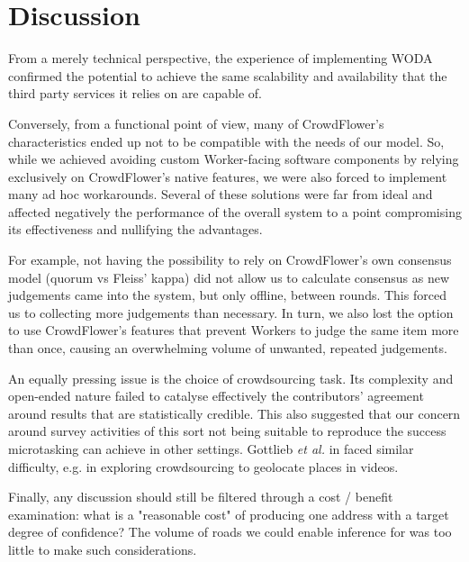 \section{Discussion}

From a merely technical perspective, the experience of implementing WODA confirmed the potential to achieve the same scalability and availability that the third party services it relies on are capable of.

Conversely, from a functional point of view, many of CrowdFlower's characteristics ended up not to be compatible with the needs of our model. So, while we achieved avoiding custom Worker-facing software components by relying exclusively on CrowdFlower's native features, we were also forced to implement many ad hoc workarounds. Several of these solutions were far from ideal and affected negatively the performance of the overall system to a point compromising its effectiveness and nullifying the advantages. 

For example, not having the possibility to rely on CrowdFlower's own consensus model (quorum vs Fleiss' kappa) did not allow us to calculate consensus as new judgements came into the system, but only offline, between rounds. This forced us to collecting more judgements than necessary. In turn, we also lost the option to use CrowdFlower's features that prevent Workers to judge the same item more than once, causing an overwhelming volume of unwanted, repeated judgements. 

An equally pressing issue is the choice of crowdsourcing task. Its complexity and open-ended nature failed to catalyse effectively the contributors' agreement around results that are statistically credible. This also suggested that our concern around survey activities of this sort not being suitable to reproduce the success microtasking can achieve in other settings. Gottlieb {\it et al.} in \cite{Gottlieb:2012fh} faced similar difficulty, e.g. in exploring crowdsourcing to geolocate places in videos.

Finally, any discussion should still be filtered through a cost / benefit examination: what is a "reasonable cost" of producing one address with a target degree of confidence? The volume of roads we could enable inference for was too little to make such considerations.